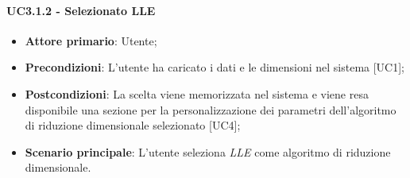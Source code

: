 \paragraph{UC3.1.2 - Selezionato LLE}
\begin{itemize}
	\item \textbf{Attore primario}: Utente;
	\item \textbf{Precondizioni}: L'utente ha caricato i dati e le dimensioni nel sistema [UC1];
	\item \textbf{Postcondizioni}: La scelta viene memorizzata nel sistema e viene resa disponibile una sezione per la personalizzazione dei parametri dell'algoritmo di riduzione dimensionale selezionato [UC4];
	\item \textbf{Scenario principale}: L'utente seleziona \textit{LLE} come algoritmo di riduzione dimensionale.

\end{itemize}